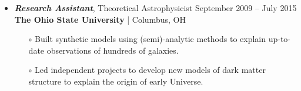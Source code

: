\documentclass[10pt]{res}
\begin{document}
\begin{resume}
\begin{itemize} [leftmargin=0.0cm]
\begin{itemize}[leftmargin=0.35cm]
 \item[$\circ$] Developed \textbf{computer vision} tool and created pipeline in Python to visualize $\sim$\textbf{1\,TB} multidimensional data generated from simulations. Analyzed data using linear/polynomial regression, correlation and classification. 
 
 \item[$\circ$] \textbf{Optimized algorithms} to solve radiative transfer equations to perform the most accurate simulations for many radiation systems, which can be observed by multi-wavelength ground and space telescopes.  
 
 \end{itemize}
 
 \vspace{0.1cm}
 
 
 \item 
{\sl  \textbf{Research Assistant}}, Theoretical Astrophysicist  \hfill September 2009 -- July 2015  \newline 
 \textbf{The Ohio State University} | Columbus, OH
 
  \begin{itemize} [leftmargin=0.35cm]
  \item[$\circ$] Built synthetic models using (semi)-analytic methods to explain up-to-date observations of hundreds of galaxies.
  \item[$\circ$] Led independent projects to develop new models of dark matter structure to explain the origin of early Universe.
  \end{itemize}
  
\end{itemize}
  
 



  

\end{resume}
\end{document}
